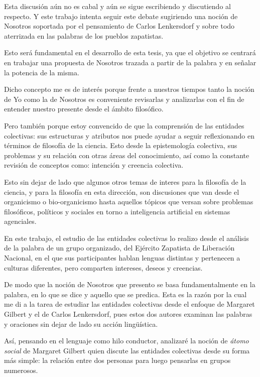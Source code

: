 \documentclass[oneside]{book}
\begin{document}
Esta discusión aún no es cabal y aún se sigue escribiendo y discutiendo al respecto. Y este trabajo intenta seguir este debate sugiriendo una noción de Nosotros soportada por el pensamiento de Carlos Lenkersdorf  y sobre todo aterrizada en las palabras de los pueblos zapatistas.

Esto será fundamental en el desarrollo de esta tesis, ya que el objetivo se centrará en trabajar una propuesta de Nosotros trazada a partir de la palabra y en señalar la potencia de la misma. 

Dicho concepto me es de interés porque frente a nuestros tiempos tanto la noción de Yo como la de Nosotros es conveniente revisarlas y analizarlas con el fin de entender nuestro presente desde el ámbito filosófico.

Pero también porque estoy convencido de que la comprensión de las entidades colectivas: sus estructuras y atributos nos puede ayudar a seguir reflexionando en términos de filosofía de la ciencia. Esto desde la epistemología colectiva, sus problemas y su relación con otras áreas del conocimiento, así como la constante revisión de conceptos como: intención y creencia colectiva. 

Esto sin dejar de lado que algunos otros temas de interes para la filosofía de la ciencia, y para la filosofía en esta dirección, son discusiones que van desde el organicismo o bio-organicismo hasta aquellos tópicos que versan sobre problemas filosóficos, políticos y sociales en torno a inteligencia artificial en sistemas agenciales.

En este trabajo, el estudio de las entidades colectivas lo realizo desde el análisis de la palabra de un grupo organizado, del Ejército Zapatista de Liberación Nacional, en el que sus participantes hablan lenguas distintas y pertenecen a culturas diferentes, pero comparten intereses, deseos y creencias.

De modo que la noción de Nosotros que presento se basa fundamentalmente en la palabra, en lo que se dice y aquello que se predica. Esta es la razón por la cual me di a la tarea de estudiar las entidades colectivas desde el enfoque de Margaret Gilbert y el de Carlos Lenkersdorf, pues estos dos autores examinan las palabras y oraciones sin dejar de lado su acción lingüística. 

Así, pensando en el lenguaje como hilo conductor, analizaré la noción de \textit{átomo social} de Margaret Gilbert quien discute las entidades colectivas desde su forma más simple: la relación entre dos personas para luego pensarlas en grupos numerosos. 
\end{document}
